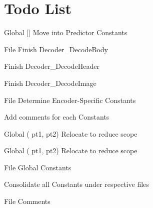 \chapter{Todo List}
\hypertarget{todo}{}\label{todo}

\begin{DoxyRefList}
\item[Global \doxylink{sample__representative_8h_aa25f2ddef46c2c5466643b137580700a}{damping} \mbox{[}\mbox{]}]\label{todo__todo000023}%
%
Move into Predictor Constants  
\item[File \doxylink{decoder_8h}{decoder.h} ]\label{todo__todo000008}%
%
Finish Decoder\+\_\+\+Decode\+Body 



Finish Decoder\+\_\+\+Decode\+Header 



Finish Decoder\+\_\+\+Decode\+Image  
\item[File \doxylink{encoder__constants_8h}{encoder\+\_\+constants.h} ]\label{todo__todo000001}%
%
Determine Encoder-\/\+Specific Constants 



Add comments for each Constants 
\item[Global \doxylink{math__functions_8h_a61e36d5241561d1bc112c291a3262565}{Euclidian2} (\doxylink{structdim2}{dim2} pt1, \doxylink{structdim2}{dim2} pt2)]\label{todo__todo000016}%
%
Relocate to reduce scope  
\item[Global \doxylink{math__functions_8h_adfddd321b4840c92df9f1d48e11c657e}{Euclidian3} (\doxylink{structdim3}{dim3} pt1, \doxylink{structdim3}{dim3} pt2)]\label{todo__todo000017}%
%
Relocate to reduce scope  
\item[File \doxylink{global__constants_8h}{global\+\_\+constants.h} ]\label{todo__todo000002}%
%
Global Constants 



Consolidate all Constants under respective files  
\item[File \doxylink{hash__table_8h}{hash\+\_\+table.h} ]\label{todo__todo000009}%
%
Comments 




\end{DoxyRefList}
